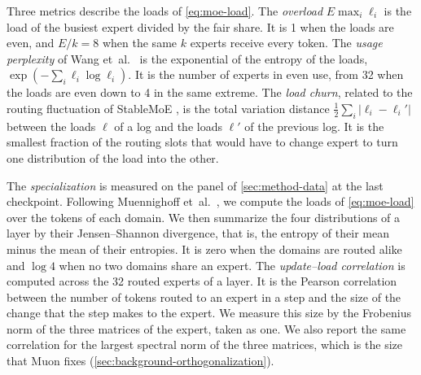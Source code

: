 Three metrics describe the loads of \cref{eq:moe-load}. The \emph{overload} $E \max_i \ell_i$ is the load of the busiest expert divided by the fair share. It is 1 when the loads are even, and $E / k = 8$ when the same $k$ experts receive every token. The \emph{usage perplexity} of Wang et~al.~\cite{wang2026depth} is the exponential of the entropy of the loads, $\exp(-\sum_i \ell_i \log \ell_i)$. It is the number of experts in even use, from 32 when the loads are even down to 4 in the same extreme. The \emph{load churn}, related to the routing fluctuation of StableMoE \cite{dai2022stablemoe}, is the total variation distance $\frac{1}{2} \sum_i \lvert \ell_i - \ell_i' \rvert$ between the loads $\boldsymbol{\ell}$ of a log and the loads $\boldsymbol{\ell}'$ of the previous log. It is the smallest fraction of the routing slots that would have to change expert to turn one distribution of the load into the other.

The \emph{specialization} is measured on the panel of \cref{sec:method-data} at the last checkpoint. Following Muennighoff et~al.~\cite{muennighoff2025olmoe}, we compute the loads of \cref{eq:moe-load} over the tokens of each domain. We then summarize the four distributions of a layer by their Jensen--Shannon divergence, that is, the entropy of their mean minus the mean of their entropies. It is zero when the domains are routed alike and $\log 4$ when no two domains share an expert. The \emph{update--load correlation} is computed across the 32 routed experts of a layer. It is the Pearson correlation between the number of tokens routed to an expert in a step and the size of the change that the step makes to the expert. We measure this size by the Frobenius norm of the three matrices of the expert, taken as one. We also report the same correlation for the largest spectral norm of the three matrices, which is the size that Muon fixes (\cref{sec:background-orthogonalization}).


